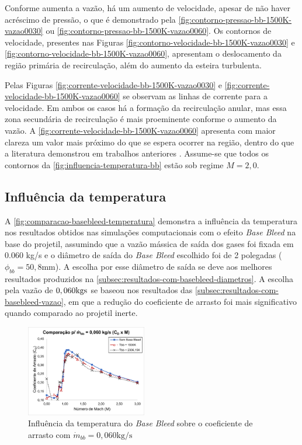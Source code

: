 Conforme aumenta a vazão, há um aumento de velocidade, apesar de não haver acréscimo de pressão, o que é demonstrado pela \autoref{fig:contorno-pressao-bb-1500K-vazao0030} ou \autoref{fig:contorno-pressao-bb-1500K-vazao0060}. Os contornos de velocidade, presentes nas Figuras \ref{fig:contorno-velocidade-bb-1500K-vazao0030} e \ref{fig:contorno-velocidade-bb-1500K-vazao0060}, apresentam o deslocamento da região primária de recirculação, além do aumento da esteira turbulenta. 

Pelas Figuras \ref{fig:corrente-velocidade-bb-1500K-vazao0030} e \ref{fig:corrente-velocidade-bb-1500K-vazao0060} se observam as linhas de corrente para a velocidade. Em ambos os casos há a formação da recirculação anular, mas essa zona secundária de recirculação é mais proeminente conforme o aumento da vazão. A \autoref{fig:corrente-velocidade-bb-1500K-vazao0060} apresenta com maior clareza um valor mais próximo do que se espera ocorrer na região, dentro do que a literatura demonstrou em trabalhos anteriores \cite{Andersson1976,Sahu1985}. Assume-se que todos os contornos da \autoref{fig:influencia-temperatura-bb} estão sob regime $M  = 2,0$.

\subsection{Influência da temperatura}

A \autoref{fig:comparacao-basebleed-temperatura} demonstra a influência da temperatura nos resultados obtidos nas simulações computacionais com o efeito \textit{Base Bleed} na base do projetil, assumindo que a vazão mássica de saída dos gases foi fixada em 0.060 kg/s e o diâmetro de saída do \textit{Base Bleed} escolhido foi de 2 polegadas ($\phi_{bb} = 50,8\unit{\mm}$). A escolha por esse diâmetro de saída se deve aos melhores resultados produzidos na \autoref{subsec:resultados-com-basebleed-diametros}. A escolha pela vazão de $0,060 \unit{\kg\/s}$ se baseou nos resultados das \autoref{subsec:resultados-com-basebleed-vazao}, em que a redução do coeficiente de arrasto foi mais significativo quando comparado ao projetil inerte.

\begin{figure}[!ht]
	\centering
	\includegraphics[width=0.47\textwidth]{cd-combasebleed-vazao006-2pol.png}
	\caption{Influência da temperatura do \textit{Base Bleed} sobre o coeficiente de arrasto com $\Dot{m}_{bb} = 0,060 \unit{\kg/\s}$}
	\label{fig:comparacao-basebleed-temperatura}
\end{figure}

